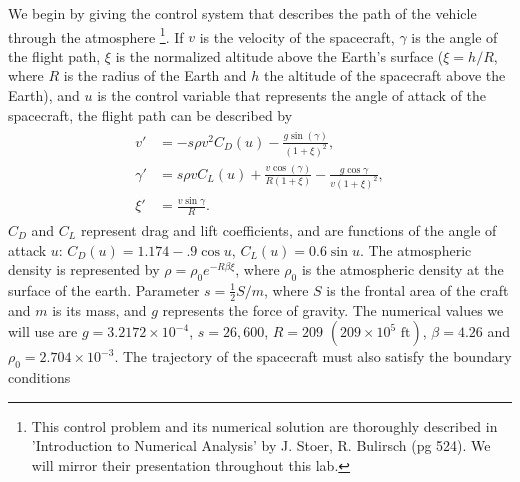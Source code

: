 \label{lab:reentry}


We begin by giving the control system that describes the path of the vehicle through the atmosphere
\footnote{This control problem and its numerical solution are thoroughly described in 'Introduction to Numerical Analysis' by J. Stoer, R. Bulirsch (pg 524). 
We will mirror their presentation throughout this lab.}. 
If $v$ is the velocity of the spacecraft, $\gamma$ is the angle of the flight path, $\xi$ is the normalized altitude above the Earth's surface ($\xi = h/R$, where $R$ is the radius of the Earth and $h$ the altitude of the spacecraft above the Earth), and $u$ is the control variable that represents the angle of attack of the spacecraft, the flight path can be described by 
\begin{align}
\begin{split}
v' &= -s\rho v^2C_D(u) - \frac{g\sin(\gamma)}{(1+\xi)^2},\\
\gamma ' &= s \rho v C_L(u) + \frac{v \cos(\gamma)}{R(1+\xi)} - \frac{g \cos \gamma}{v(1+\xi)^2},\\
\xi' &= \frac{v \sin \gamma}{R}.
\end{split} \label{eqn:reentry:control_system}
\end{align}
$C_D$ and $C_L$ represent drag and lift coefficients, and are functions of the angle of attack $u$: $C_D(u) = 1.174 - .9\cos u$, $C_L(u) = 0.6\sin u$. 
The atmospheric density is represented by $\rho = \rho_0e^{-R\beta\xi}$, where  $\rho_0$ is the atmospheric density at the surface of the earth. 
Parameter $s = \frac{1}{2}S/m$, where $S$ is the frontal area of the craft and $m$ is its mass, and $g$ represents the force of gravity. 
The numerical values we will use are $g = 3.2172\times10^{-4}$, $s = 26,600$, $R = 209$ $(209\times 10^5 \text{ ft})$, $\beta = 4.26$ and $\rho_0 = 2.704\times 10^{-3}$.
The trajectory of the spacecraft must also satisfy the boundary conditions
